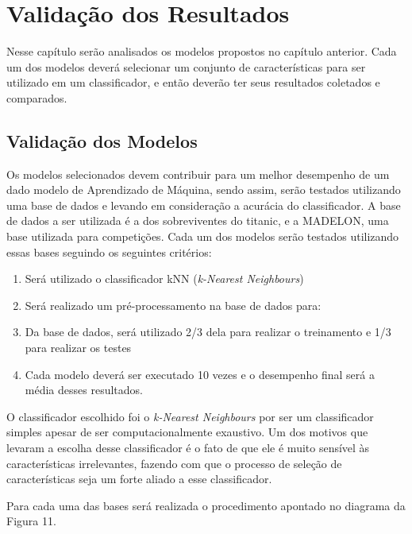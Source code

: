 \chapter[Validação dos Resultados]{Validação dos Resultados}

Nesse capítulo serão analisados os modelos propostos no capítulo anterior. Cada um dos modelos deverá selecionar um conjunto de características para ser utilizado em um classificador, e então deverão ter seus resultados coletados e comparados. 


\section{Validação dos Modelos}

Os modelos selecionados devem contribuir para um melhor desempenho de um dado modelo de Aprendizado de Máquina, sendo assim, serão testados utilizando uma base de dados e levando em consideração a acurácia do classificador. A base de dados a ser utilizada é a dos sobreviventes do titanic, e a MADELON, uma base utilizada para competições. Cada um dos modelos serão testados utilizando essas bases seguindo os seguintes critérios:

\begin{enumerate}
	\item{Será utilizado o classificador kNN (\textit{k-Nearest Neighbours})}
	\item{Será realizado um pré-processamento na base de dados para:}
	\item{Da base de dados, será utilizado 2/3 dela para realizar o treinamento e 1/3 para realizar os testes}
	\item{Cada modelo deverá ser executado 10 vezes e o desempenho final será a média desses resultados.}
\end{enumerate}

O classificador escolhido foi o \textit{k-Nearest Neighbours} por ser um classificador simples apesar de ser computacionalmente exaustivo. Um dos motivos que levaram a escolha desse classificador é o fato de que ele é muito sensível às características irrelevantes, fazendo com que o processo de seleção de características seja um forte aliado a esse classificador.

Para cada uma das bases será realizada o procedimento apontado no diagrama da Figura 11.

